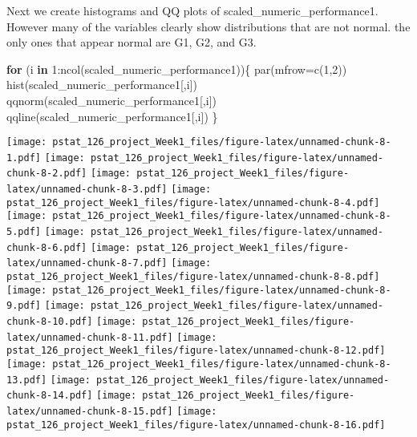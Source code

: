 \documentclass[
]{article}
\newenvironment{Shaded}{\begin{snugshade}}{\end{snugshade}}
\newcommand{\AttributeTok}[1]{\textcolor[rgb]{0.77,0.63,0.00}{#1}}
\newcommand{\CommentTok}[1]{\textcolor[rgb]{0.56,0.35,0.01}{\textit{#1}}}
\newcommand{\ControlFlowTok}[1]{\textcolor[rgb]{0.13,0.29,0.53}{\textbf{#1}}}
\newcommand{\DecValTok}[1]{\textcolor[rgb]{0.00,0.00,0.81}{#1}}
\newcommand{\FunctionTok}[1]{\textcolor[rgb]{0.00,0.00,0.00}{#1}}
\newcommand{\NormalTok}[1]{#1}
\newcommand{\SpecialCharTok}[1]{\textcolor[rgb]{0.00,0.00,0.00}{#1}}
\begin{document}
Next we create histograms and QQ plots of scaled\_numeric\_performance1.
However many of the variables clearly show distributions that are not
normal. the only ones that appear normal are G1, G2, and G3.

\begin{Shaded}
\begin{Highlighting}[]
\ControlFlowTok{for}\NormalTok{ (i }\ControlFlowTok{in} \DecValTok{1}\SpecialCharTok{:}\FunctionTok{ncol}\NormalTok{(scaled\_numeric\_performance1))\{}
  \FunctionTok{par}\NormalTok{(}\AttributeTok{mfrow=}\FunctionTok{c}\NormalTok{(}\DecValTok{1}\NormalTok{,}\DecValTok{2}\NormalTok{))}
  \FunctionTok{hist}\NormalTok{(scaled\_numeric\_performance1[,i])}
  \FunctionTok{qqnorm}\NormalTok{(scaled\_numeric\_performance1[,i])}
  \FunctionTok{qqline}\NormalTok{(scaled\_numeric\_performance1[,i])}
\NormalTok{\}}
\end{Highlighting}
\end{Shaded}

\texttt{[image: pstat\_126\_project\_Week1\_files/figure-latex/unnamed-chunk-8-1.pdf]}
\texttt{[image: pstat\_126\_project\_Week1\_files/figure-latex/unnamed-chunk-8-2.pdf]}
\texttt{[image: pstat\_126\_project\_Week1\_files/figure-latex/unnamed-chunk-8-3.pdf]}
\texttt{[image: pstat\_126\_project\_Week1\_files/figure-latex/unnamed-chunk-8-4.pdf]}
\texttt{[image: pstat\_126\_project\_Week1\_files/figure-latex/unnamed-chunk-8-5.pdf]}
\texttt{[image: pstat\_126\_project\_Week1\_files/figure-latex/unnamed-chunk-8-6.pdf]}
\texttt{[image: pstat\_126\_project\_Week1\_files/figure-latex/unnamed-chunk-8-7.pdf]}
\texttt{[image: pstat\_126\_project\_Week1\_files/figure-latex/unnamed-chunk-8-8.pdf]}
\texttt{[image: pstat\_126\_project\_Week1\_files/figure-latex/unnamed-chunk-8-9.pdf]}
\texttt{[image: pstat\_126\_project\_Week1\_files/figure-latex/unnamed-chunk-8-10.pdf]}
\texttt{[image: pstat\_126\_project\_Week1\_files/figure-latex/unnamed-chunk-8-11.pdf]}
\texttt{[image: pstat\_126\_project\_Week1\_files/figure-latex/unnamed-chunk-8-12.pdf]}
\texttt{[image: pstat\_126\_project\_Week1\_files/figure-latex/unnamed-chunk-8-13.pdf]}
\texttt{[image: pstat\_126\_project\_Week1\_files/figure-latex/unnamed-chunk-8-14.pdf]}
\texttt{[image: pstat\_126\_project\_Week1\_files/figure-latex/unnamed-chunk-8-15.pdf]}
\texttt{[image: pstat\_126\_project\_Week1\_files/figure-latex/unnamed-chunk-8-16.pdf]}

\begin{Shaded}
\end{Shaded}
\end{document}
